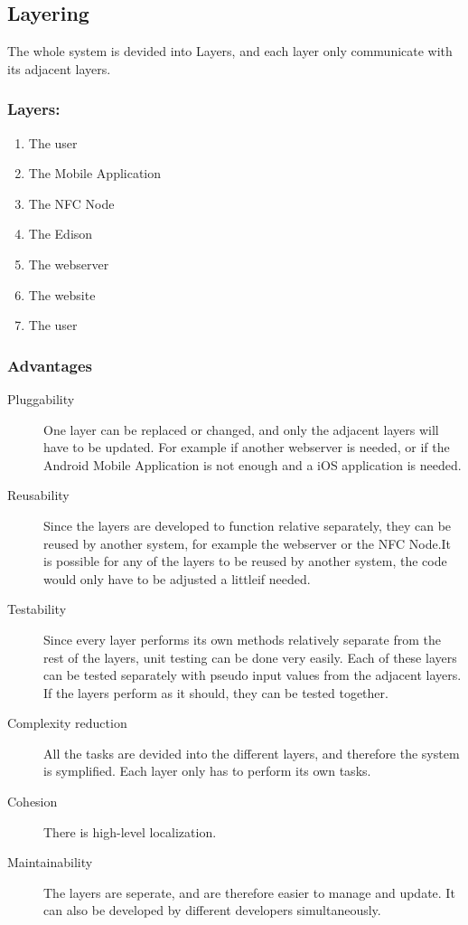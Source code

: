 \documentclass[a4paper,12pt,titlepage]{article}
\begin{document}
\subsection{Layering}The whole system is devided into Layers, and each layer only communicate with its adjacent layers.
\subsubsection{Layers:}
\begin{enumerate}
\item The user
\item The Mobile Application
\item The NFC Node
\item The Edison
\item The webserver
\item The website
\item The user
\end{enumerate}
\subsubsection{Advantages}
\begin{description}
\item[Pluggability] One layer can be replaced or changed, and only the adjacent layers will have to be updated. For example if another webserver is needed, or if the Android Mobile Application is not enough and a iOS application is needed.
\item[Reusability] Since the layers are developed to function relative separately, they can be reused by another system, for example the webserver or the NFC Node.It is possible for any of the layers to be reused by another system, the code would only have to be adjusted a littleif needed.  
\item[Testability] Since every layer performs its own methods relatively separate from the rest of the layers, unit testing can be done very easily. Each of these layers can be tested separately with pseudo input values from the adjacent layers. If the layers perform as it should, they can be tested together.
\item[Complexity reduction] All the tasks are devided into the different layers, and therefore the system is symplified. Each layer only has to perform its own tasks.
\item[Cohesion] There is high-level localization. 
\item[Maintainability] The layers are seperate, and are therefore easier to manage and update. It can also be developed by different developers simultaneously. 
\end{description}
\end{document}
